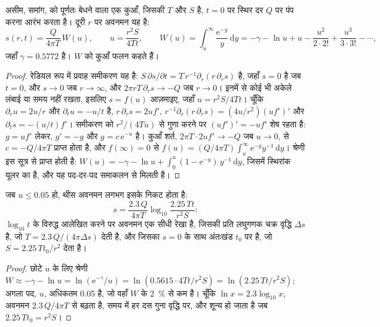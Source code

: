 \begin{theorem}[थीस हल]\label{thm:b3:hydrogeology:theis}
असीम, समांग,  को पूर्णतः बेधने वाला एक कुआँ, जिसकी
 $T$ और  $S$ है, $t = 0$ पर स्थिर दर
$Q$ पर पंप करना आरंभ करता है। दूरी $r$ पर अवनमन यह है:
\[
s(r, t) = \frac{Q}{4\pi T}\,W(u), \qquad u = \frac{r^2S}{4Tt}, \qquad
W(u) = \int_u^\infty\frac{\mathrm e^{-y}}{y}\,\mathrm dy = -\gamma - \ln u +
u - \frac{u^2}{2\cdot2!} + \frac{u^3}{3\cdot3!} - \cdots,
\]
जहाँ $\gamma = \num{0.5772}$ है। $W$ को कुआँ फलन कहते हैं।
\end{theorem}

\begin{proof}
रेडियल रूप में प्रवाह समीकरण यह है: $S\,\partial s/\partial t =
T\,r^{-1}\partial_r(r\,\partial_rs)$ है, जहाँ $s = 0$ है जब $t = 0$, और $s \to 0$
जब $r \to \infty$, और $2\pi rT\,\partial_rs \to -Q$ जब $r \to 0$। इनमें से
कोई भी अकेले लंबाई या समय नहीं रखता, इसलिए $s = f(u)$ आज़माइए, जहाँ $u =
r^2S/4Tt$। चूँकि $\partial_ru = 2u/r$ और $\partial_tu = -u/t$ है, $r\,\partial_rs =
2uf'$, $r^{-1}\partial_r(r\,\partial_rs) = (4u/r^2)(uf')'$ और $\partial_ts =
-(u/t)f'$। समीकरण को $r^2/(4Tu)$ से गुणा करने पर $(uf')' = -uf'$ शेष रहता है:
$g = uf'$ लेकर, $g' = -g$ और $g = c\,\mathrm e^{-u}$ है। कुआँ शर्त, $2\pi T\cdot2uf' \to -Q$ जब $u \to 0$, से $c =
-Q/4\pi T$ प्राप्त होता है, और $f(\infty) = 0$ से $f(u) = (Q/4\pi T)\int_u^\infty
\mathrm e^{-y}y^{-1}\,\mathrm dy$। श्रेणी इस सूत्र से प्राप्त होती है:
$W(u) = -\gamma - \ln u + \int_0^u(1 - \mathrm e^{-y})\,y^{-1}\,\mathrm dy$,
जिसमें स्थिरांक यूलर का है, और यह पद-दर-पद समाकलन से मिलती है।
\end{proof}

\begin{proposition}[कूपर--जेकब सन्निकटन]\label{prop:b3:hydrogeology:cooper-jacob}
जब $u \le 0.05$ हो, थीस अवनमन लगभग इसके निकट होता है:
\[
s = \frac{2.3\,Q}{4\pi T}\log_{10}\frac{2.25\,Tt}{r^2S} :
\]
$\log_{10}t$ के विरुद्ध आलेखित करने पर अवनमन एक सीधी रेखा है, जिसकी प्रति
लघुगणक चक्र वृद्धि $\Delta s$ है, जो $T = 2.3\,Q/(4\pi\Delta s)$ देती है, और जिसका
$s = 0$ के साथ अंतःखंड $t_0$ पर है, जो $S = 2.25\,Tt_0/r^2$ देता है।
\end{proposition}

\begin{proof}
छोटे $u$ के लिए श्रेणी $W \approx -\gamma - \ln u = \ln(\mathrm
e^{-\gamma}/u) = \ln(0.5615\cdot4Tt/r^2S) = \ln(2.25\,Tt/r^2S)$; अगला
पद, $u$, अधिकतम \num{0.05} है, जो वहाँ $W$ के \qty{2}{\percent} से कम है।
चूँकि $\ln x = 2.3\log_{10}x$, अवनमन $2.3\,Q/4\pi T$ से बढ़ता है, समय में
हर दस गुना वृद्धि पर, और शून्य हो जाता है जब $2.25\,Tt_0 = r^2S$।
\end{proof}

